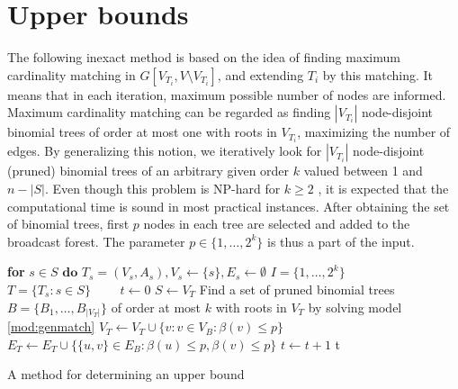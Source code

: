 \section{Upper bounds}

The following inexact method is based on the idea of finding maximum cardinality matching in $G\left[V_{T_i},V\setminus V_{T_i}\right]$, and extending $T_i$ by this matching.
It means that in each iteration, maximum possible number of nodes are informed.
Maximum cardinality matching can be regarded as finding $|V_{T_i}|$ node-disjoint  binomial trees of order at most one with roots in $V_{T_i}$, maximizing the number of edges.
By generalizing this notion, we iteratively look for $|V_{T_i}|$ node-disjoint (pruned) binomial trees of an arbitrary given order $k$ valued between 1 and $n-|S|$.
Even though this problem is NP-hard for $k\geq 2$ \cite{jansen95}, it is expected that the computational time is sound in most practical instances.
After obtaining the set of binomial trees, first $p$ nodes in each tree are selected and added to the broadcast forest.
The parameter $p\in \{1,\dots,2^k\}$ is thus a part of the input.
\begin{algorithm}[]
\textbf{for }$s\in S\textbf{ do }T_s=(V_s,A_s), V_s\leftarrow \{s\}, E_s\leftarrow\emptyset$\;
$I=\{1,\dots,2^k\}$\\
$T=\{T_s:s\in S\}$\ ~~~
$t\leftarrow 0$\;
 {
	$S\leftarrow V_T$\;
	Find a set of pruned binomial trees $B=\{B_1,\dots,B_{|V_T|}\}$ of order at most $k$ with roots in $V_T$ by solving model \ref{mod:genmatch}\;
	$V_T\leftarrow V_T\cup \{v:v\in V_B:\beta(v)\leq p\}$\;
	$E_T\leftarrow E_T\cup \{\{u,v\}\in E_B: \beta(u)\leq p,\beta(v)\leq p\}$\;
	$t\leftarrow t+1$\;
}
\Return t\;
 \caption{A method for determining an upper bound}
\label{alg:match}
\end{algorithm}

